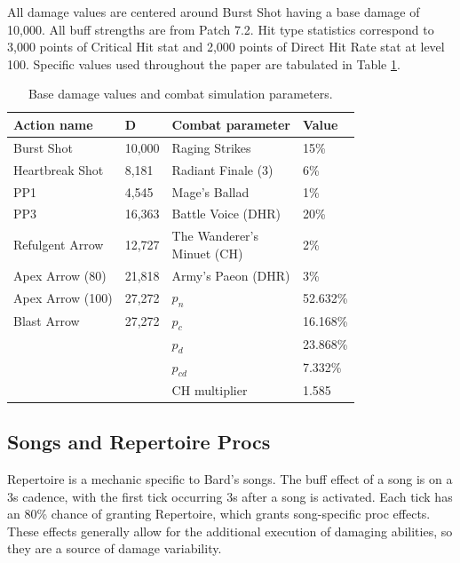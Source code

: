 All damage values are centered around Burst Shot having a base damage of 10,000. All buff strengths are from Patch 7.2. Hit type statistics correspond to 3,000 points of Critical Hit stat and 2,000 points of Direct Hit Rate stat at level 100. Specific values used throughout the paper are tabulated in Table \ref{t:combat-params}.

\begin{table}[H]
\centering
\caption{Base damage values and combat simulation parameters.}
\label{t:combat-params}
\begin{tabular}{@{}llll@{}}
\toprule
\textbf{Action name} & $\mathbf{D}$ & \textbf{Combat parameter}  & \textbf{Value} \\ \midrule
Burst Shot           & 10,000      & Raging Strikes             & 15\%                   \\
Heartbreak Shot      & 8,181       & Radiant Finale (3)         & 6\%                    \\
PP1                  & 4,545       & Mage's Ballad              & 1\%                    \\
PP3                  & 16,363      & Battle Voice (DHR)         & 20\%                   \\
Refulgent Arrow      & 12,727      & \makecell[lt]{The Wanderer's\\Minuet (CH)} & 2\%    \\
Apex Arrow (80)      & 21,818      & Army's Paeon (DHR)         & 3\%                    \\
Apex Arrow (100)     & 27,272      & $p_n$                      & 52.632\%        \\
Blast Arrow          & 27,272      & $p_c$                      & 16.168\%        \\
                     &             & $p_d$                      & 23.868\%        \\
                     &             & $p_{cd}$                   &  7.332\%        \\
                     &             & CH multiplier              & 1.585         \\ \bottomrule
\end{tabular}
\end{table}

\subsection{Songs and Repertoire Procs}

Repertoire is a mechanic specific to Bard's songs. The buff effect of a song is on a 3s cadence, with the first tick occurring 3s after a song is activated. Each tick has an 80\% chance of granting Repertoire, which grants song-specific proc effects. These effects generally allow for the additional execution of damaging abilities, so they are a source of damage variability.

